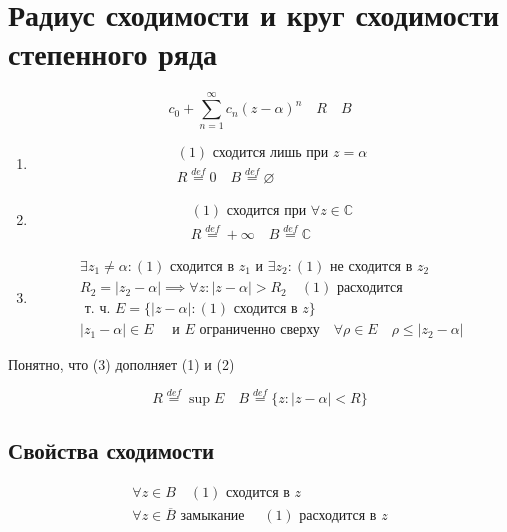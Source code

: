 \documentclass[main]{subfiles}
\begin{document}
\section{Радиус сходимости и круг сходимости степенного ряда}
   \[ c_0 + \sum^\infty_{n=1} c_n(z-\alpha)^n  \quad R \quad B\tag{1} \]
\begin{enumerate}
    \item \begin{gather*}
        (1) \text{ сходится лишь при } z = \alpha \\
        R \stackrel{def}{=} 0 \quad B \stackrel{def}{=} \varnothing
    \end{gather*}
    \item \begin{gather*}
        (1) \text{ сходится при } \forall z \in \mathbb{C} \\
        R \stackrel{def}{=} +\infty \quad B \stackrel{def}{=} \mathbb{C}
    \end{gather*}
    \item \begin{gather*}
        \exists z_1 \ne \alpha : (1) \text{ сходится  в } z_1 \text{ и } \exists z_2 : (1) \text{ не сходится в } z_2 \\
        R_2 = |z_2 - \alpha| \implies \forall z : |z-\alpha| > R_2 \quad (1) \text{ расходится } \\
        \text{ т. ч. } E = \{ |z-\alpha|: (1) \text{ сходится в } z \} \\
        |z_1 - \alpha| \in E \quad \text{ и } E \text{ ограниченно сверху} \quad \forall \rho \in E \quad \rho \leq |z_2 - \alpha|
    \end {gather*}
\end{enumerate}
Понятно, что (3) дополняет (1) и (2)
\begin{definition}
    \[ R \stackrel{def}{=} \sup E \quad B \stackrel{def}{=} \{ z: |z-\alpha| < R \} \]
\end{definition}
\subsection*{Свойства сходимости} 
\begin{theorem}
    \begin{gather*}
        \forall z \in B \quad (1) \text{ сходится в } z \tag{2} \\
        \forall z \in \overline{B} \text{ замыкание } \quad (1) \text{ расходится в } z \tag{3} 
    \end{gather*}
\end{theorem}
\end{document}
